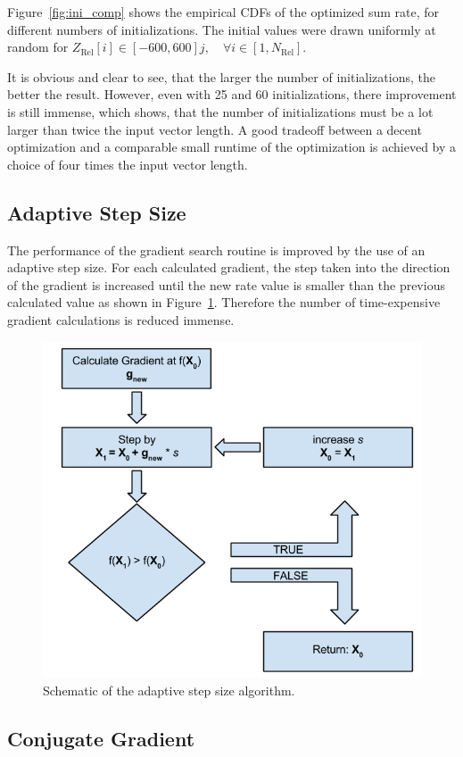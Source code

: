 Figure~\ref{fig:ini_comp} shows the empirical CDFs of the optimized sum rate, for different numbers of initializations.
The initial values were drawn uniformly at random for $Z_{\text{Rel}}[i]\in[-600,600] j , \quad\forall i\in[1,N_{\text{Rel}}]$.

It is obvious and clear to see, that the larger the number of initializations, the better the result.
However, even with 25 and 60 initializations, there improvement is still immense, which shows, that the number of initializations must be a lot larger than twice the input vector length.
A good tradeoff between a decent optimization and a comparable small runtime of the optimization is achieved by a choice of four times the input vector length.

\subsection{Adaptive Step Size}
\label{sec:grads_stepsize}

The performance of the gradient search routine is improved by the use of an adaptive step size.
For each calculated gradient, the step taken into the direction of the gradient is increased until the new rate value is smaller than the previous calculated value as shown in Figure~\ref{fig:stepsize}.
Therefore the number of time-expensive gradient calculations is reduced immense.

\begin{figure}[h]
\centering
  \includegraphics[width=0.5\linewidth]{images/stepsize_scheme.png}
\caption{Schematic of the adaptive step size algorithm.}
\label{fig:stepsize}
\end{figure}


\subsection{Conjugate Gradient}
\label{sec:grads_conjgrad}


